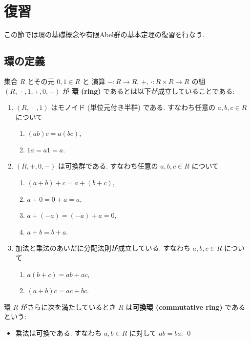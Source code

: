 \documentclass[12pt,twoside]{jarticle}
\begin{document}

\section{復習}
\label{sec:fukushu}

この節では環の基礎概念や有限Abel群の基本定理の復習を行なう.


\subsection{環の定義}

\begin{definition}[環, 可換環]
 集合 $R$ とその元 $0,1\in R$ と
 演算 $-:R\to R$, $+,\,\cdot:R\times R\to R$ の組 $(R,\,\cdot\,,1,+,0,-)$ が
 {\bf 環 (ring)} であるとは以下が成立していることである:
 \begin{enumerate}
  \item $(R,\,\cdot\,,1)$ はモノイド (単位元付き半群) である.
  すなわち任意の $a,b,c\in R$ について
  \begin{enumerate}
   \item $(ab)c=a(bc)$,
   \item $1a=a1=a$.
  \end{enumerate}
  \item $(R,+,0,-)$ は可換群である. 
  すなわち任意の $a,b,c\in R$ について
  \begin{enumerate}
   \item $(a+b)+c = a+(b+c)$,
   \item $a+0 = 0+a = a$,
   \item $a + (-a) = (-a) + a = 0$,
   \item $a+b = b+a$.
  \end{enumerate}
  \item 加法と乗法のあいだに分配法則が成立している. 
  すなわち $a,b,c\in R$ について
  \begin{enumerate}
   \item $a(b+c)=ab+ac$,
   \item $(a+b)c=ac+bc$.
  \end{enumerate}
 \end{enumerate}
 環 $R$ がさらに次を満たしているとき %
 $R$ は{\bf 可換環 (commutative ring)} であるという:
 \begin{itemize}
  \item 乗法は可換である. すなわち $a,b\in R$ に対して $ab=ba$. 
 \qed
 \end{itemize}
\end{definition}
\end{document}
